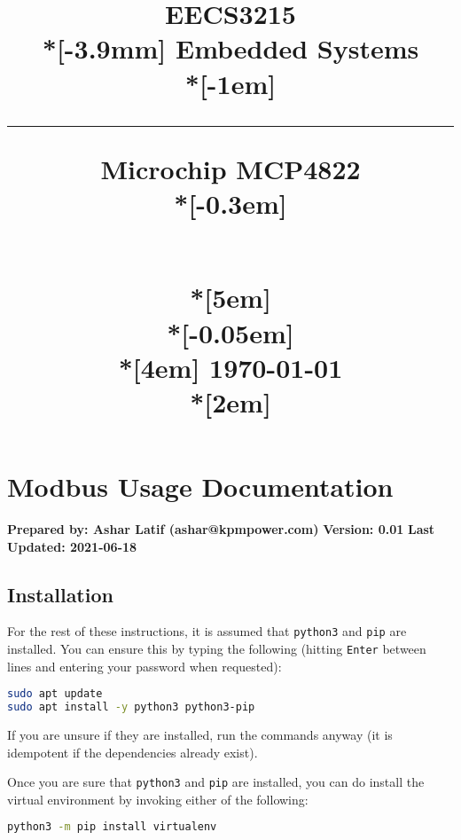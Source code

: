 \documentclass[10pt,]{article}
\title{
		\begin{flushright}
			\sffamily
			\vspace*{0em}
			\noindent
			\hspace{-0.40em}\YUGE 	\bfseries	\color{ cyan
				} \textbf{EECS3215} \\*[-3.9mm]
			\Yuge 		\color{black} \textbf{Embedded Systems}   \\*[-1em]
			\color{black}		\hrule 		 	\vspace   	{10em}
		\end{flushright}
		\begin{flushleft}
			\sffamily
			\Subtitle  	\color{black} \textbf{Microchip MCP4822}		\\*[-0.3em]
							\hspace{-0.65em} \subtitle	\color{cyan} \text{ HAL and Driver
Documentation} 	\\*[5em]
										\Huge	\color{black} \text{Ashar Latif}		\\*[-0.05em]
										\LARGE	\color{cyan} \text{215178734}	\\*[4em]
									\Large		\color{cyan}			\today				\\*[2em]
		\end{flushleft}
		}
\date{\vspace{1mm}}
\newcommand{\passthrough}[1]{#1}
\begin{document}
			\thispagestyle{title}
		\maketitle

		 \vspace{-20mm}
			{
			
			\setcounter{tocdepth}{3}
			\tableofcontents \vspace{15mm}
			}
			\thispagestyle{plain}
			
			
			\cleardoublepage
			\newpage
		
			


\hypertarget{modbus-usage-documentation}{%
\section{Modbus Usage Documentation}\label{modbus-usage-documentation}}

\textbf{Prepared by: Ashar Latif (ashar@kpmpower.com)} \textbf{Version:
0.01} \textbf{Last Updated: 2021-06-18}

\hypertarget{installation}{%
\subsection{Installation}\label{installation}}

For the rest of these instructions, it is assumed that
\passthrough{\lstinline!python3!} and \passthrough{\lstinline!pip!} are
installed. You can ensure this by typing the following (hitting
\passthrough{\lstinline!Enter!} between lines and entering your password
when requested):

\begin{lstlisting}[language=bash]
sudo apt update
sudo apt install -y python3 python3-pip
\end{lstlisting}

If you are unsure if they are installed, run the commands anyway (it is
idempotent if the dependencies already exist).

Once you are sure that \passthrough{\lstinline!python3!} and
\passthrough{\lstinline!pip!} are installed, you can do install the
virtual environment by invoking either of the following:

\begin{lstlisting}[language=bash]
python3 -m pip install virtualenv
\end{lstlisting}
\end{document}
